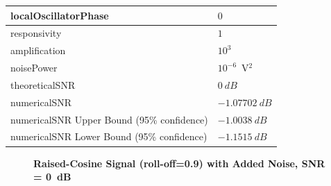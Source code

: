 \begin{refsection}
\begin{table}[H]
\begin{tabular}{|l|l|}
		localOscillatorPhase   & $0$                                                        \\ \hline
		responsivity           & $1$                                                        \\ \hline
		amplification          & $10^3$                                                     \\ \hline
		noisePower   & $10^{-6}$~V$^2$                             					\\ \hline
		theoreticalSNR  	   & $0~dB$                             					\\ \hline
		numericalSNR 		     & $-1.07702~dB$                             					\\ \hline
		numericalSNR Upper Bound (95\% confidence) & $-1.0038~dB$                             					\\ \hline
		numericalSNR Lower Bound (95\% confidence) & $-1.1515~dB$                             					\\ \hline
	\end{tabular}
\end{table}
\begin{figure}[H]
		\centering
	\textbf{Raised-Cosine Signal (roll-off=0.9) with Added Noise, SNR = 0~dB}
	\begin{minipage}{\linewidth}
		\centering
	\begin{subfigure}{.45\textwidth}
		\centering

\end{subfigure}
\end{minipage}
\end{figure}
\end{refsection}

